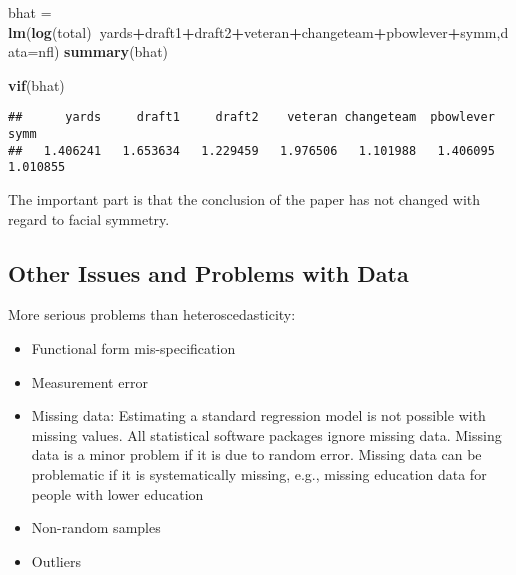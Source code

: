 \documentclass[
]{article}
\newenvironment{Shaded}{\begin{snugshade}}{\end{snugshade}}
\newcommand{\DataTypeTok}[1]{\textcolor[rgb]{0.13,0.29,0.53}{#1}}
\newcommand{\KeywordTok}[1]{\textcolor[rgb]{0.13,0.29,0.53}{\textbf{#1}}}
\newcommand{\NormalTok}[1]{#1}
\newcommand{\OperatorTok}[1]{\textcolor[rgb]{0.81,0.36,0.00}{\textbf{#1}}}
\newcommand{\StringTok}[1]{\textcolor[rgb]{0.31,0.60,0.02}{#1}}
\providecommand{\tightlist}{%
  \setlength{\itemsep}{0pt}\setlength{\parskip}{0pt}}
\begin{document}
\begin{Shaded}
\begin{Highlighting}[]
\NormalTok{bhat =}\StringTok{ }\KeywordTok{lm}\NormalTok{(}\KeywordTok{log}\NormalTok{(total)}\OperatorTok{~}\NormalTok{yards}\OperatorTok{+}\NormalTok{draft1}\OperatorTok{+}\NormalTok{draft2}\OperatorTok{+}\NormalTok{veteran}\OperatorTok{+}\NormalTok{changeteam}\OperatorTok{+}\NormalTok{pbowlever}\OperatorTok{+}\NormalTok{symm,}\DataTypeTok{data=}\NormalTok{nfl)}
\KeywordTok{summary}\NormalTok{(bhat)}
\end{Highlighting}
\end{Shaded}

\begin{Shaded}
\begin{Highlighting}[]
\KeywordTok{vif}\NormalTok{(bhat)}
\end{Highlighting}
\end{Shaded}

\begin{verbatim}
##      yards     draft1     draft2    veteran changeteam  pbowlever       symm 
##   1.406241   1.653634   1.229459   1.976506   1.101988   1.406095   1.010855
\end{verbatim}

The important part is that the conclusion of the paper has not changed with regard to facial symmetry.

\hypertarget{other-issues-and-problems-with-data}{%
\subsection{Other Issues and Problems with Data}\label{other-issues-and-problems-with-data}}

More serious problems than heteroscedasticity:

\begin{itemize}
\tightlist
\item
  Functional form mis-specification
\item
  Measurement error
\item
  Missing data: Estimating a standard regression model is not possible with missing values. All statistical software packages ignore missing data. Missing data is a minor problem if it is due to random error. Missing data can be problematic if it is systematically missing, e.g., missing education data for people with lower education
\item
  Non-random samples
\item
  Outliers
\end{itemize}
\end{document}
